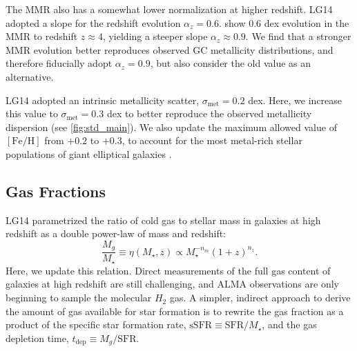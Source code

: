 \documentclass[fleqn,usenatbib]{mnras}
\newcommand{\tdep}{t_{\mathrm{dep}}}
\newcommand{\Mstar}{M_{\star}}
\newcommand{\SFR}{\mathrm{SFR}}
\newcommand{\sSFR}{\mathrm{sSFR}}
\newcommand{\feh}{\mathrm{[Fe/H]}}
\begin{document}
The MMR also has a somewhat lower normalization at higher redshift. LG14 adopted a slope for the redshift evolution $\alpha_z = 0.6$. \cite{mannucci_etal_2009} show 0.6 dex evolution in the MMR to redshift $z \approx 4$, yielding a steeper slope $\alpha_z \approx 0.9$. We find that a stronger MMR evolution better reproduces observed GC metallicity distributions, and therefore fiducially adopt $\alpha_z = 0.9$, but also consider the old value as an alternative. 

LG14 adopted an intrinsic metallicity scatter, $\sigma_{\mathrm{met}} = 0.2$ dex. Here, we increase this value to $\sigma_{\mathrm{met}} = 0.3$ dex to better reproduce the observed metallicity dispersion (see \autoref{fig:std_main}). We also update the maximum allowed value of $\feh$ from $+0.2$ to $+0.3$, to account for the most metal-rich stellar populations of giant elliptical galaxies \citep{harris_etal16_bcg2}.

\subsection{Gas Fractions}
\label{sec:gasfraction}

LG14 parametrized the ratio of cold gas to stellar mass in galaxies at high redshift as a double power-law of mass and redshift:
\begin{equation}
  \frac{M_g}{\Mstar} \equiv \eta(\Mstar,z) \propto \Mstar^{-n_m} (1+z)^{n_z}.
\end{equation}
Here, we update this relation. Direct measurements of the full gas content of galaxies at high redshift are still challenging, and ALMA observations are only beginning to sample the molecular $H_2$ gas. A simpler, indirect approach to derive the amount of gas available for star formation is to rewrite the gas fraction as a product of the specific star formation rate, $\sSFR \equiv \SFR/\Mstar$, and the gas depletion time, $\tdep \equiv M_g/\SFR$.
\end{document}
